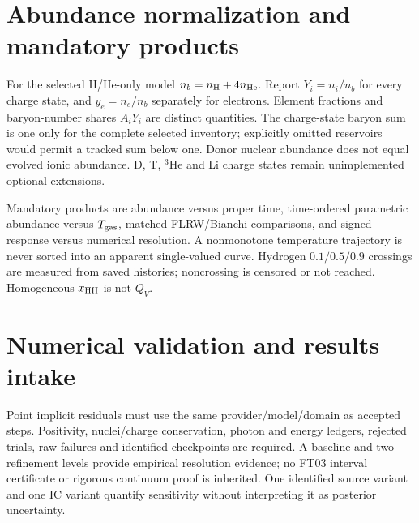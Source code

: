 \documentclass[11pt]{article}
\begin{document}
\section{Abundance normalization and mandatory products}
For the selected H/He-only model $n_b=n_{\rm H}+4n_{\rm He}$. Report $Y_i=n_i/n_b$ for every charge state, and $y_e=n_e/n_b$ separately for electrons. Element fractions and baryon-number shares $A_iY_i$ are distinct quantities. The charge-state baryon sum is one only for the complete selected inventory; explicitly omitted reservoirs would permit a tracked sum below one. Donor nuclear abundance does not equal evolved ionic abundance. D, T, $^3$He and Li charge states remain unimplemented optional extensions.

Mandatory products are abundance versus proper time, time-ordered parametric abundance versus $T_{\rm gas}$, matched FLRW/Bianchi comparisons, and signed response versus numerical resolution. A nonmonotone temperature trajectory is never sorted into an apparent single-valued curve. Hydrogen $0.1/0.5/0.9$ crossings are measured from saved histories; noncrossing is censored or not reached. Homogeneous $x_{\rm HII}$ is not $Q_V$.

\section{Numerical validation and results intake}
Point implicit residuals must use the same provider/model/domain as accepted steps. Positivity, nuclei/charge conservation, photon and energy ledgers, rejected trials, raw failures and identified checkpoints are required. A baseline and two refinement levels provide empirical resolution evidence; no FT03 interval certificate or rigorous continuum proof is inherited. One identified source variant and one IC variant quantify sensitivity without interpreting it as posterior uncertainty.

\begin{center}
\end{center}
\end{document}
